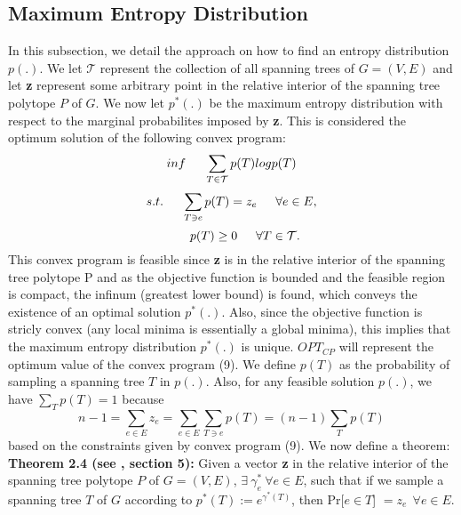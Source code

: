 \documentclass[oneside]{projectpaper} %
\begin{document}
\subsection{Maximum Entropy Distribution}
In this subsection, we detail the approach on how to find an entropy distribution $p(.)$. We let $\mathcal{T}$ represent the collection of all spanning trees of $G = (V, E)$ and let \textbf{z} represent some arbitrary point in the relative interior of the spanning tree polytope $P$ of $G$. We now let $p^*(.)$ be the maximum entropy distribution with respect to the marginal probabilites imposed by \textbf{z}. This is considered the optimum solution of the following convex program:
\begin{equation}
inf \indent \sum\limits_{T \in \mathcal{T}}p(T)logp(T)
\end{equation}
\begin{equation*}
s.t. \indent \sum\limits_{T \ni e}p(T) = z_e \indent \forall e \in E,
\end{equation*}
\begin{equation*}
\indent \ \ p(T) \geq 0 \indent \forall T \in \mathcal{T}.
\end{equation*}
This convex program is feasible since \textbf{z} is in the relative interior of the spanning tree polytope P and as the objective function is bounded and the feasible region is compact, the infinum (greatest lower bound) is found, which conveys the existence of an optimal solution $p^*(.)$. Also, since the objective function is stricly convex (any local minima is essentially a global minima), this implies that the maximum entropy distribution $p^*(.)$ is unique. $OPT_{CP}$ will represent the optimum value of the convex program (9). \newline
\indent We define $p(T)$ as the probability of sampling a spanning tree $T$ in $p(.)$. Also, for any feasible solution $p(.)$, we have $\sum\limits_{T}p(T) = 1$ because
\begin{equation*}
n - 1 = \sum\limits_{e \in E}z_e = \sum\limits_{e \in E}\sum\limits_{T \ni e}p(T) = (n - 1)\sum\limits_{T}p(T)
\end{equation*}
based on the constraints given by convex program (9). We now define a theorem: 
\newline
\newline
\textbf{Theorem 2.4 (see \cite{AGM10}, section 5):} Given a vector \textbf{z} in the relative interior of the spanning tree polytope $P$ of $G = (V, E)$, $\exists \ \gamma_{e}^{*} \ \forall e\in E$, such that if we sample a spanning tree $T$ of $G$ according to $p^*(T) := e^{\gamma^*(T)}$, then Pr[$e \in T$] $= z_e \ \ \forall e \in E$.
\end{document}

